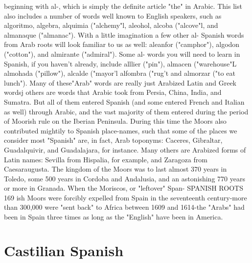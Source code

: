 beginning with al-, which is simply the definite article "the" in Arabic. This list also includes a number of words well known to English
speakers, such as algoritmo, algebra, alquimia ("alchemy"l, aleohol,
alcoba ("alcove"l, and almanaque ("almanac"). With a little imagination a few other al- Spanish words from Arab roots will look familiar
to us as well: aleanfor ("camphor"), algodon ("cotton"), and almirante
("admiral"). Some al- words you will need to learn in Spanish, if you
haven't already, include alllier ("pin"), almacen ("warehouse"L almohada ("pillow"), alcalde ("mayor'l alfombra ("rug't and almorzar
("to eat lunch").
Many of these"Arab" words are really just Arabized Latin and
Greek wordsj others are words that Arabic took from Persia, China, India, and Sumatra. But all of them entered Spanish (and some entered
French and Italian as well) through Arabic, and the vast majority of
them entered during the period of Moorish rule on the Iberian Peninsula. During this time the Moors also contributed mightily to Spanish
place-names, such that some of the places we consider most "Spanish"
are, in fact, Arab toponyms: Caceres, Gibraltar, Guadalquivir, and
Guadalajara, for instance. Many others are Arabized forms of Latin
names: Sevilla from Hispalia, for example, and Zaragoza from Caesaraugusta.
The kingdom of the Moors was to last almost 370 years in Toledo, some 500 years in Cordoba and Andalusia, and an astonishing
770 years or more in Granada. When the Moriscos, or "leftover" Span-
SPANISH ROOTS 169
ish Moors were forcibly expelled from Spain in the seventeenth century-more than 300,000 were "sent back" to Africa between 1609
and 1614-the "Arabs" had been in Spain three times as long as the
"English" have been in America.

\section{Castilian Spanish}

